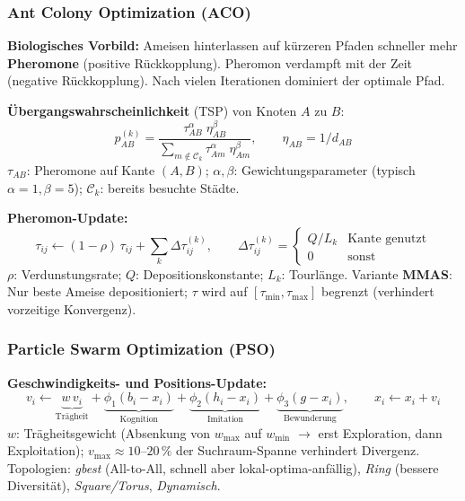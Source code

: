 \subsubsection*{Ant Colony Optimization (ACO)}

\textbf{Biologisches Vorbild:} Ameisen hinterlassen auf kürzeren Pfaden schneller mehr \textbf{Pheromone} (positive Rückkopplung). Pheromon verdampft mit der Zeit (negative Rückkopplung). Nach vielen Iterationen dominiert der optimale Pfad.

\textbf{Übergangswahrscheinlichkeit} (TSP) von Knoten $A$ zu $B$:
\[
p_{AB}^{(k)} = \frac{\tau_{AB}^{\alpha}\;\eta_{AB}^{\beta}}{\sum_{m \notin \mathcal{C}_k} \tau_{Am}^{\alpha}\;\eta_{Am}^{\beta}}, \qquad \eta_{AB} = 1/d_{AB}
\]
$\tau_{AB}$: Pheromone auf Kante $(A,B)$; $\alpha, \beta$: Gewichtungsparameter (typisch $\alpha=1, \beta=5$); $\mathcal{C}_k$: bereits besuchte Städte.

\textbf{Pheromon-Update:}
\[
\tau_{ij} \leftarrow (1-\rho)\,\tau_{ij} + \sum_{k} \Delta\tau_{ij}^{(k)}, \qquad \Delta\tau_{ij}^{(k)} = \begin{cases} Q/L_k & \text{Kante genutzt} \\ 0 & \text{sonst} \end{cases}
\]
$\rho$: Verdunstungsrate; $Q$: Depositionskonstante; $L_k$: Tourlänge. Variante \textbf{MMAS}: Nur beste Ameise depositioniert; $\tau$ wird auf $[\tau_\text{min}, \tau_\text{max}]$ begrenzt (verhindert vorzeitige Konvergenz).

\subsubsection*{Particle Swarm Optimization (PSO)}


\textbf{Geschwindigkeits- und Positions-Update:}
\[
v_i \leftarrow \underbrace{w\,v_i}_{\text{Trägheit}} + \underbrace{\phi_1(b_i - x_i)}_{\text{Kognition}} + \underbrace{\phi_2(h_i - x_i)}_{\text{Imitation}} + \underbrace{\phi_3(g - x_i)}_{\text{Bewunderung}}, \qquad x_i \leftarrow x_i + v_i
\]
$w$: Trägheitsgewicht (Absenkung von $w_\text{max}$ auf $w_\text{min}$ $\to$ erst Exploration, dann Exploitation); $v_\text{max} \approx 10$--$20\,\%$ der Suchraum-Spanne verhindert Divergenz. Topologien: \textit{gbest} (All-to-All, schnell aber lokal-optima-anfällig), \textit{Ring} (bessere Diversität), \textit{Square/Torus}, \textit{Dynamisch}.

